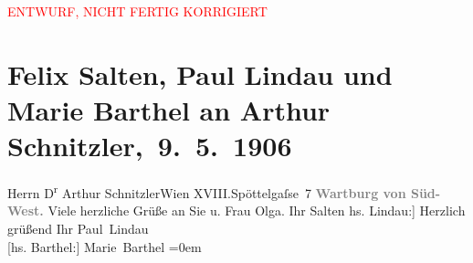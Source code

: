 
\begin{center}
            \textcolor{red}{ENTWURF, NICHT FERTIG KORRIGIERT}
                      \end{center}
            
         
         \renewcommand{\erwaehntePersonen}{Personen: Marie Barthel, Paul Lindau, Felix Salten, Olga Schnitzler}
         \renewcommand{\erwaehnteOrte}{Orte: Edmund-Weiß-Gasse 7, Wartburg, Wien, XVIII., Währing}
         \renewcommand{\erwaehnteWerke}{}
               \section[Felix Salten, Paul Lindau und Marie Barthel an Arthur Schnitzler, 9. 5. 1906]{ Felix Salten, Paul Lindau und Marie Barthel an Arthur
               Schnitzler, 9. 5. 1906}\nopagebreak{}\rehead{ }\begin{ledgroupsized}[t]{13cm}\normalsize\beginnumbering \toendnotes[C]{\smallbreak\pagebreak[2]} 
\pstart{}{\pb}Herrn D\textsuperscript{r} Arthur Schnitzler\pend{}\pstart{}Wien XVIII.\pend{}\pstart{}Spöttelgaſse 7\pend{}{\bigskip}\pstart
           \noindent{}{\pb}\textcolor{gray}{\textbf{Wartburg von Süd-West.}}\pend
           \pstart
           {\pb}Viele herzliche Grüße an Sie u.
               Frau Olga.\pend
           \pstart Ihr \spacefill\mbox{Salten}\pend{}\pstart
           \noindent{}{[}hs. Lindau:{]} Herzlich grüßend\pend
           \pstart
           Ihr \spacefill\mbox{Paul Lindau}{\\[\baselineskip]}{[}hs. Barthel:{]} \spacefill\mbox{Marie Barthel}\pend
           \leftskip=0em{}
         
         \endnumbering{}\end{ledgroupsized}  \newcommand{\dateiname}{L03423}\newcommand{\titel}{Felix Salten, Paul Lindau und Marie Barthel an Arthur Schnitzler, 9. 5. 1906}\newcommand{\editorInnen}{Martin Anton Müller und Laura Untner}
      